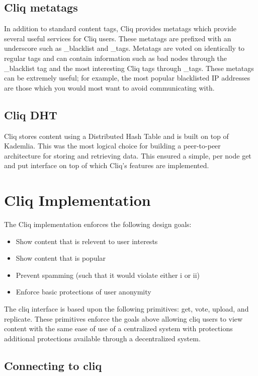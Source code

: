 \documentclass{sig-alternate}
\begin{document}
\subsection{Cliq metatags}

In addition to standard content tags, Cliq provides metatags which provide several useful services for Cliq users. 
These metatags are prefixed with an underscore such as \_blacklist and \_tags. 
Metatags are voted on identically to regular tags and can contain information such as bad nodes through the \_blacklist tag and the most interesting Cliq tags through \_tags. 
These metatags can be extremely useful; for example, the most popular blacklisted IP addresses are those which you would most want to avoid communicating with. 

\subsection{Cliq DHT}

Cliq stores content using a Distributed Hash Table and is built on top of Kademlia. 
This was the most logical choice for building a peer-to-peer architecture for storing and retrieving data. 
This ensured a simple, per node get and put interface on top of which Cliq's features are implemented. 

\section{Cliq Implementation}

The Cliq implementation enforces the following design goals: 

\begin{itemize}
\item Show content that is relevent to user interests
\item Show content that is popular
\item Prevent spamming (such that it would violate either i or ii)
\item Enforce basic protections of user anonymity
\end{itemize}

The cliq interface is based upon the following primitives: get, vote, upload, and replicate. 
These primitives enforce the goals above allowing cliq users to view content with the same ease of use of a centralized system with protections additional protections available through a decentralized system. 

\subsection{Connecting to cliq}
\end{document}
